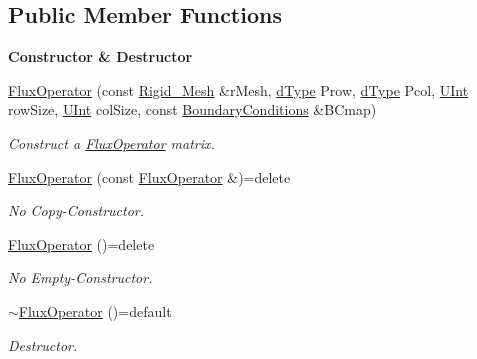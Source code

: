 \subsection*{Public Member Functions}
\begin{Indent}{\bf Constructor \& Destructor}\par
\begin{DoxyCompactItemize}
\item 
\hyperlink{classFVCode3D_1_1FluxOperator_ab88c6dc79edd84880bda5bfec64de246}{Flux\+Operator} (const \hyperlink{classFVCode3D_1_1Rigid__Mesh}{Rigid\+\_\+\+Mesh} \&r\+Mesh, \hyperlink{classFVCode3D_1_1global__Operator_a9e94fbe56b84ba80f9e9be56c808e5c3}{d\+Type} Prow, \hyperlink{classFVCode3D_1_1global__Operator_a9e94fbe56b84ba80f9e9be56c808e5c3}{d\+Type} Pcol, \hyperlink{namespaceFVCode3D_a4bf7e328c75d0fd504050d040ebe9eda}{U\+Int} row\+Size, \hyperlink{namespaceFVCode3D_a4bf7e328c75d0fd504050d040ebe9eda}{U\+Int} col\+Size, const \hyperlink{classFVCode3D_1_1BoundaryConditions}{Boundary\+Conditions} \&B\+Cmap)
\begin{DoxyCompactList}\small\item\em Construct a \hyperlink{classFVCode3D_1_1FluxOperator}{Flux\+Operator} matrix. \end{DoxyCompactList}\item 
\hyperlink{classFVCode3D_1_1FluxOperator_a5ae82e031a91d354d56230a414480543}{Flux\+Operator} (const \hyperlink{classFVCode3D_1_1FluxOperator}{Flux\+Operator} \&)=delete
\begin{DoxyCompactList}\small\item\em No Copy-\/\+Constructor. \end{DoxyCompactList}\item 
\hyperlink{classFVCode3D_1_1FluxOperator_aa450dac102775a2a5b778e8e41f5350a}{Flux\+Operator} ()=delete
\begin{DoxyCompactList}\small\item\em No Empty-\/\+Constructor. \end{DoxyCompactList}\item 
\hyperlink{classFVCode3D_1_1FluxOperator_ad291f43373088ce0709fe651a8f9b84f}{$\sim$\+Flux\+Operator} ()=default
\begin{DoxyCompactList}\small\item\em Destructor. \end{DoxyCompactList}\end{DoxyCompactItemize}
\end{Indent}
